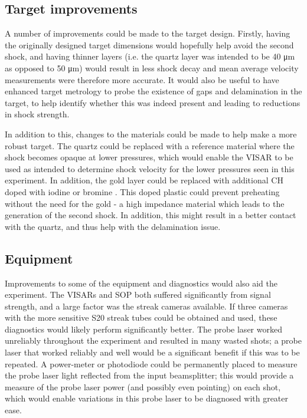 \subsection{Target improvements}
A number of improvements could be made to the target design. Firstly, having the originally designed target dimensions would hopefully help avoid the second shock, and having thinner layers (i.e. the quartz layer was intended to be 40 \unit{\micro\meter} as opposed to 50 \unit{\micro\meter}) would result in less shock decay and mean average velocity measurements were therefore more accurate. It would also be useful to have enhanced target metrology to probe the existence of gaps and delamination in the target, to help identify whether this was indeed present and leading to reductions in shock strength.

In addition to this, changes to the materials could be made to help make a more robust target. The quartz could be replaced with a reference material where the shock becomes opaque at lower pressures, which would enable the VISAR to be used as intended to determine shock velocity for the lower pressures seen in this experiment. In addition, the gold layer could be replaced with additional CH doped with iodine or bromine \cite{Desjardins2021}. This doped plastic could prevent preheating without the need for the gold - a high impedance material which leads to the generation of the second shock. In addition, this might result in a better contact with the quartz, and thus help with the delamination issue.

\subsection{Equipment}
Improvements to some of the equipment and diagnostics would also aid the experiment. The VISARs and SOP both suffered significantly from signal strength, and a large factor was the streak cameras available. If three cameras with the more sensitive S20 streak tubes could be obtained and used, these diagnostics would likely perform significantly better. The probe laser worked unreliably throughout the experiment and resulted in many wasted shots; a probe laser that worked reliably and well would be a significant benefit if this was to be repeated. A power-meter or photodiode could be permanently placed to measure the probe laser light reflected from the input beamsplitter; this would provide a measure of the probe laser power (and possibly even pointing) on each shot, which would enable variations in this probe laser to be diagnosed with greater ease.

